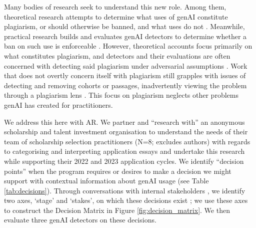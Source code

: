 Many bodies of research seek to understand this new role. Among them, theoretical research attempts to determine what uses of genAI constitute plagiarism, or should otherwise be banned, and what uses do not \cite{yu_huang_reflection_2023,MikePerkins_JasperRoe_2023}. Meanwhile, practical research builds and evaluates genAI detectors to determine whether a ban on such use is enforceable \cite{mitchell_detectgpt_2023,tharindu_kumarage_stylometric_2023,kalpesh_krishna_paraphrasing_2023}. However, theoretical accounts focus primarily on what constitutes plagiarism, and detectors and their evaluations are often concerned with detecting said plagiarism under adversarial assumptions \cite{yu_huang_reflection_2023,kalpesh_krishna_paraphrasing_2023}. Work that does not overtly concern itself with plagiarism still grapples with issues of detecting and removing cohorts or passages, inadvertently viewing the problem through a plagiarism lens \cite{mitchell_detectgpt_2023,liang_gpt_2023}. This focus on plagiarism neglects other problems genAI has created for practitioners.

We address this here with AR. We partner and ``research with'' \cite{bradbury_action_2003} an anonymous scholarship and talent investment organisation to understand the needs of their team of scholarship selection practitioners (N=8; excludes authors) with regards to categorising and interpreting application essays and undertake this research while supporting their 2022 and 2023 application cycles. We identify ``decision points'' when the program requires or desires to make a decision we might support with contextual information about genAI usage (see Table \ref{tab:decisions}). Through conversations with internal stakeholders \cite{Hayes_2011}, we identify two axes, `stage' and `stakes', on which these decisions exist \cite{braun_using_2006}; we use these axes to construct the Decision Matrix in Figure \ref{fig:decision_matrix}. We then evaluate three genAI detectors on these decisions.

